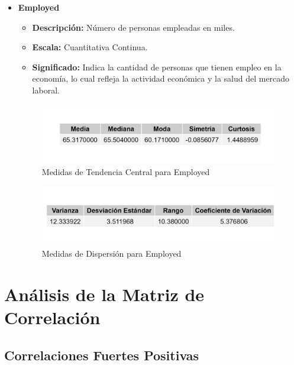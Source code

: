 \documentclass{article}
\begin{document}
\begin{itemize}
    \item \textbf{Employed}
    \begin{itemize}
        \item \textbf{Descripción:} Número de personas empleadas en miles.
        \item \textbf{Escala:} Cuantitativa Continua.
        \item \textbf{Significado:} Indica la cantidad de personas que tienen empleo en la economía, lo cual refleja la actividad económica y la salud del mercado laboral.
    \end{itemize}
    \begin{figure}[H]
        \centering
        \includegraphics[width=\textwidth]{MTC/Employed_central.png}
        \caption{Medidas de Tendencia Central para Employed}
    \end{figure}
    \begin{figure}[H]
        \centering
        \includegraphics[width=\textwidth]{MTC/Employed_dispersion.png}
        \caption{Medidas de Dispersión para Employed}
    \end{figure}
\end{itemize}




\section{Análisis de la Matriz de Correlación}

\subsection{Correlaciones Fuertes Positivas}
\end{document}
